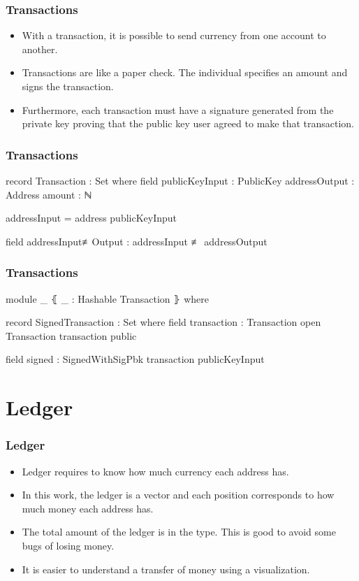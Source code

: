 \documentclass{beamer}
\begin{document}
\begin{frame}
   \frametitle{Transactions}
   \begin{itemize}[<+->]
     \item With a transaction, it is possible to send currency from one account to another.
     \item Transactions are like a paper check. The individual specifies an amount and signs the transaction.
    \item Furthermore, each transaction must have a signature generated from the private key proving that the public key user agreed to make that transaction.
   \end{itemize}
\end{frame}

\begin{frame}
  \frametitle{Transactions}
\begin{code}
  record Transaction : Set where
    field
      publicKeyInput : PublicKey
      addressOutput  : Address
      amount         : ℕ

    addressInput = address publicKeyInput

    field
      addressInput≢Output : addressInput ≢ addressOutput

\end{code}
\end{frame}

\begin{frame}
  \frametitle{Transactions}
\begin{code}

  module _ ⦃ _ : Hashable Transaction ⦄ where

    record SignedTransaction  : Set where
      field
        transaction : Transaction
      open Transaction transaction public

      field
        signed : SignedWithSigPbk transaction publicKeyInput
\end{code}
\end{frame}

\section{Ledger}

\begin{frame}
  \frametitle{Ledger}
   \begin{itemize}[<+->]
     \item Ledger requires to know how much currency each address has.
     \item In this work, the ledger is a vector and each position corresponds to how much money each address has.
     \item The total amount of the ledger is in the type. This is good to avoid some bugs of losing money.
     \item It is easier to understand a transfer of money using a visualization.
   \end{itemize}
\end{frame}
\end{document}
